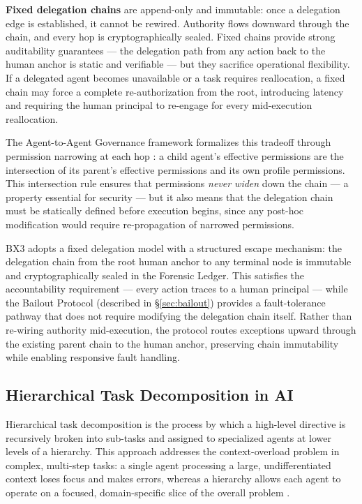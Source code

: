 \textbf{Fixed delegation chains} are append-only and immutable: once a delegation edge is established, it cannot be rewired. Authority flows downward through the chain, and every hop is cryptographically sealed. Fixed chains provide strong auditability guarantees — the delegation path from any action back to the human anchor is static and verifiable — but they sacrifice operational flexibility. If a delegated agent becomes unavailable or a task requires reallocation, a fixed chain may force a complete re-authorization from the root, introducing latency and requiring the human principal to re-engage for every mid-execution reallocation.

The Agent-to-Agent Governance framework formalizes this tradeoff through permission narrowing at each hop \cite{agenticcontrolplane2025}: a child agent's effective permissions are the intersection of its parent's effective permissions and its own profile permissions. This intersection rule ensures that permissions \emph{never widen} down the chain — a property essential for security — but it also means that the delegation chain must be statically defined before execution begins, since any post-hoc modification would require re-propagation of narrowed permissions.

BX3 adopts a fixed delegation model with a structured escape mechanism: the delegation chain from the root human anchor to any terminal node is immutable and cryptographically sealed in the Forensic Ledger. This satisfies the accountability requirement — every action traces to a human principal — while the Bailout Protocol (described in \S\ref{sec:bailout}) provides a fault-tolerance pathway that does not require modifying the delegation chain itself. Rather than re-wiring authority mid-execution, the protocol routes exceptions upward through the existing parent chain to the human anchor, preserving chain immutability while enabling responsive fault handling.

\subsection{Hierarchical Task Decomposition in AI}
\label{sec:hierarchical-decomposition}

Hierarchical task decomposition is the process by which a high-level directive is recursively broken into sub-tasks and assigned to specialized agents at lower levels of a hierarchy. This approach addresses the context-overload problem in complex, multi-step tasks: a single agent processing a large, undifferentiated context loses focus and makes errors, whereas a hierarchy allows each agent to operate on a focused, domain-specific slice of the overall problem \cite{ibm2025hierarchical, heavybit2025multiagent}.

